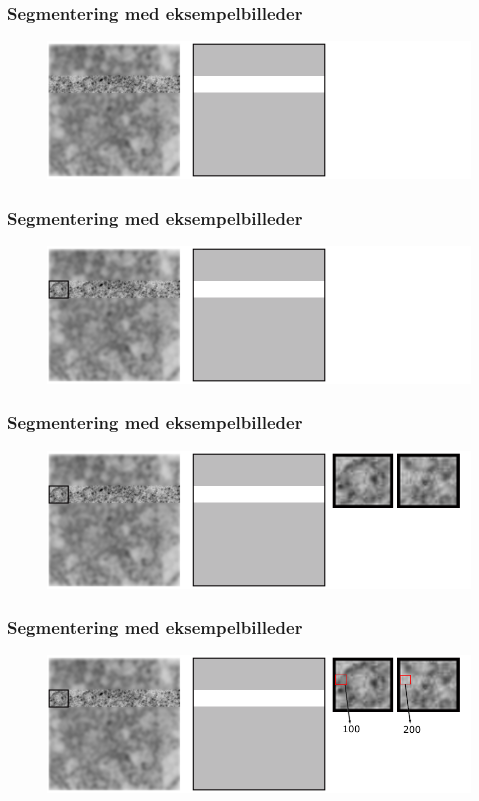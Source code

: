 \documentclass[12pt,t]{beamer}
\begin{document}
\begin{frame}
\frametitle{Segmentering med eksempelbilleder}
\begin{figure}[H]
\includegraphics[scale=0.35]{img/afstand/4.png}
\end{figure}
\end{frame}

\begin{frame}
\frametitle{Segmentering med eksempelbilleder}
\begin{figure}[H]
\includegraphics[scale=0.35]{img/afstand/5.png}
\end{figure}
\end{frame}


\begin{frame}
\frametitle{Segmentering med eksempelbilleder}
\begin{figure}[H]
\includegraphics[scale=0.35]{img/afstand/6.png}
\end{figure}
\end{frame}


\begin{frame}
\frametitle{Segmentering med eksempelbilleder}
\begin{figure}[H]
\includegraphics[scale=0.35]{img/afstand/7.png}
\end{figure}
\end{frame}
\end{document}
